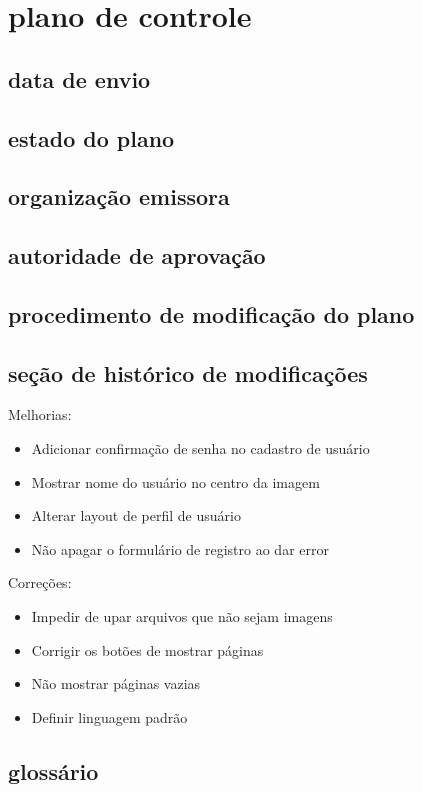 \chapter{plano de controle}

\section{data de envio}

\section{estado do plano}

\section{organização emissora}

\section{autoridade de aprovação}

\section{procedimento de modificação do plano}

\section{seção de histórico de modificações}

Melhorias:

 \begin{itemize}
   \item Adicionar confirmação de senha no cadastro de usuário
   \item Mostrar nome do usuário no centro da imagem
   \item Alterar layout de perfil de usuário
   \item Não apagar o formulário de registro ao dar error
 \end{itemize}

Correções:

 \begin{itemize}
   \item Impedir de upar arquivos que não sejam imagens
   \item Corrigir os botões de mostrar páginas
   \item Não mostrar páginas vazias
   \item Definir linguagem padrão
 \end{itemize}

\section{glossário}
